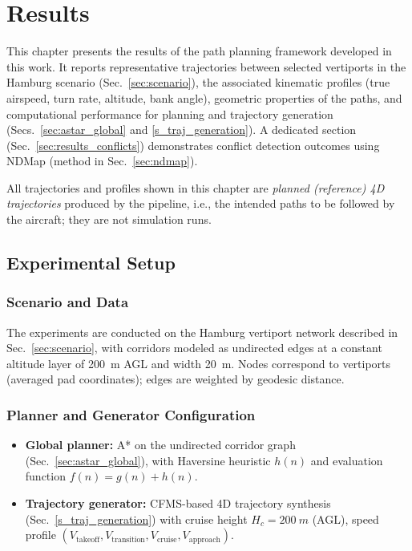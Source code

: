 \chapter{Results}
\label{s_results}

This chapter presents the results of the path planning framework developed in this work. 
It reports representative trajectories between selected vertiports in the Hamburg scenario (Sec.~\ref{sec:scenario}), 
the associated kinematic profiles (true airspeed, turn rate, altitude, bank angle), 
geometric properties of the paths, and computational performance for planning and trajectory generation 
(Secs.~\ref{sec:astar_global} and \ref{s_traj_generation}). 
A dedicated section (Sec.~\ref{sec:results_conflicts}) demonstrates conflict detection outcomes using NDMap (method in Sec.~\ref{sec:ndmap}).

\medskip
\noindent
All trajectories and profiles shown in this chapter are \emph{planned (reference) 4D trajectories} produced by the pipeline, i.e., the intended paths to be followed by the aircraft; they are not simulation runs.

\section{Experimental Setup}
\label{sec:results_setup}

\subsection{Scenario and Data}
The experiments are conducted on the Hamburg vertiport network described in Sec.~\ref{sec:scenario}, 
with corridors modeled as undirected edges at a constant altitude layer of \SI{200}{m} AGL and width \SI{20}{m}. 
Nodes correspond to vertiports (averaged pad coordinates); edges are weighted by geodesic distance.

\subsection{Planner and Generator Configuration}
\begin{itemize}
  \item \textbf{Global planner:} A* on the undirected corridor graph (Sec.~\ref{sec:astar_global}), with Haversine heuristic \(h(n)\) and evaluation function \(f(n)=g(n)+h(n)\).
  \item \textbf{Trajectory generator:} CFMS-based 4D trajectory synthesis (Sec.~\ref{s_traj_generation}) with cruise height \(H_c=\SI{200}{m}\) (AGL), speed profile \((V_{\text{takeoff}}, V_{\text{transition}}, V_{\text{cruise}}, V_{\text{approach}})\).
\end{itemize}

